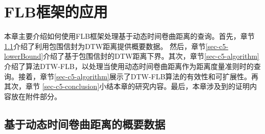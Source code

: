 \chapter{FLB框架的应用}\label{chapter:FLBDTW}

本章主要介绍如何使用FLB框架处理基于动态时间卷曲距离的查询。首先，章节\ref{sec-c5-DTWsummary}介绍了利用包围信封为DTW距离提供概要数据。 然后，章节\ref{sec-c5-lowerBound}介绍了基于包围信封的DTW距离下界。其次，章节\ref{sec-c5-algorithm}介绍了算法DTW-FLB，以处理当使用动态时间卷曲距离作为距离度量准则时的查询。接着，章节\ref{sec-c5-algorithm}展示了DTW-FLB算法的有效性和可扩展性。再其次，章节 \ref{sec-c5-conclusion}小结本章的研究内容。最后，本章涉及到的证明内容放在附件部分。


\section{基于动态时间卷曲距离的概要数据}\label{sec-c5-DTWsummary}

